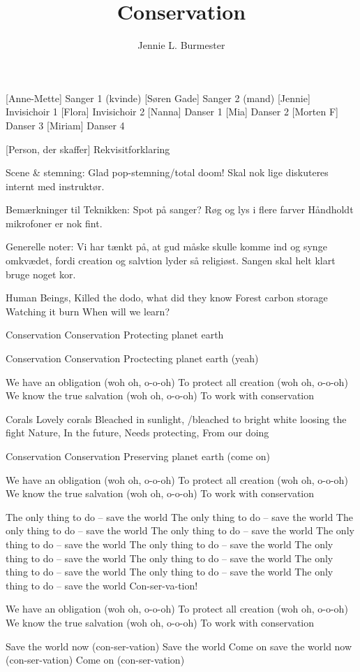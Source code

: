 \documentclass[a4paper,11pt]{article}
\title{Conservation}
\author{Jennie L. Burmester}
\begin{document}
\maketitle

\begin{roles}
    [Anne-Mette] Sanger 1 (kvinde)
    [Søren Gade] Sanger 2 (mand)
    [Jennie] Invisichoir 1
    [Flora] Invisichoir 2
    [Nanna] Danser 1
    [Mia] Danser 2
    [Morten F] Danser 3
    [Miriam] Danser 4
\end{roles}

\begin{props}
    [Person, der skaffer] Rekvisitforklaring
\end{props}

\scene 
Scene \& stemning:
Glad pop-stemning/total doom! Skal nok lige diskuteres internt med instruktør.

Bemærkninger til Teknikken:
Spot på sanger?
Røg og lys i flere farver
Håndholdt mikrofoner er nok fint.

Generelle noter:
Vi har tænkt på, at gud måske skulle komme ind og synge omkvædet, fordi creation og salvtion lyder så religiøst.
Sangen skal helt klart bruge noget kor.

\begin{song}
Human
Beings,
Killed the dodo,
what did they know
Forest
carbon storage
Watching it burn
When will we learn?

Conservation 
Conservation
Protecting planet earth

Conservation 
Conservation
Proctecting planet earth (yeah)

We have an obligation (woh oh, o-o-oh)
To protect all creation (woh oh, o-o-oh)
We know the true salvation (woh oh, o-o-oh)
To work with conservation

Corals
Lovely corals
Bleached in sunlight, /bleached to bright white
loosing the fight
Nature,
In the future,
Needs protecting,
From our doing

Conservation 
Conservation
Preserving planet earth (come on)

We have an obligation (woh oh, o-o-oh)
To protect all creation (woh oh, o-o-oh)
We know the true salvation (woh oh, o-o-oh)
To work with conservation

The only thing to do – save the world
The only thing to do – save the world
The only thing to do – save the world
The only thing to do – save the world
The only thing to do – save the world
The only thing to do – save the world
The only thing to do – save the world
The only thing to do – save the world
The only thing to do – save the world
The only thing to do – save the world
The only thing to do – save the world
Con-ser-va-tion!

We have an obligation (woh oh, o-o-oh)
To protect all creation (woh oh, o-o-oh)
We know the true salvation (woh oh, o-o-oh)
To work with conservation

Save the world now (con-ser-vation)
Save the world
Come on save the world now (con-ser-vation)
Come on (con-ser-vation)
\end{song}
\end{document}
